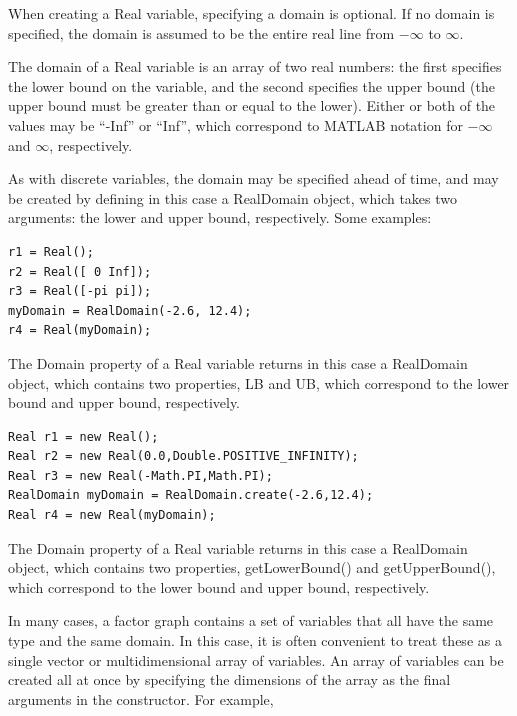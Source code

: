 
When creating a Real variable, specifying a domain is optional.  If no domain is specified, the domain is assumed to be the entire real line from $-\infty$ to $\infty$.

The domain of a Real variable is an array of two real numbers: the first specifies the lower bound on the variable, and the second specifies the upper bound (the upper bound must be greater than or equal to the lower).  Either or both of the values may be ``-Inf'' or ``Inf'', which correspond to MATLAB notation for $-\infty$ and $\infty$, respectively.

As with discrete variables, the domain may be specified ahead of time, and may be created by defining in this case a RealDomain object, which takes two arguments: the lower and upper bound, respectively.  Some examples:

\ifmatlab
\begin{lstlisting}
r1 = Real();
r2 = Real([ 0 Inf]);
r3 = Real([-pi pi]);
myDomain = RealDomain(-2.6, 12.4);
r4 = Real(myDomain);
\end{lstlisting}

The Domain property of a Real variable returns in this case a RealDomain object, which contains two properties, LB and UB, which correspond to the lower bound and upper bound, respectively.

\fi

\ifjava
\begin{lstlisting}
Real r1 = new Real();
Real r2 = new Real(0.0,Double.POSITIVE_INFINITY);
Real r3 = new Real(-Math.PI,Math.PI);
RealDomain myDomain = RealDomain.create(-2.6,12.4);
Real r4 = new Real(myDomain);
\end{lstlisting}

The Domain property of a Real variable returns in this case a RealDomain object, which contains two properties, getLowerBound() and getUpperBound(), which correspond to the lower bound and upper bound, respectively.
\fi

\ifmatlab


In many cases, a factor graph contains a set of variables that all have the same type and the same domain.  In this case, it is often convenient to treat these as a single vector or multidimensional array of variables.  An array of variables can be created all at once by specifying the dimensions of the array as the final arguments in the constructor.  For example,

